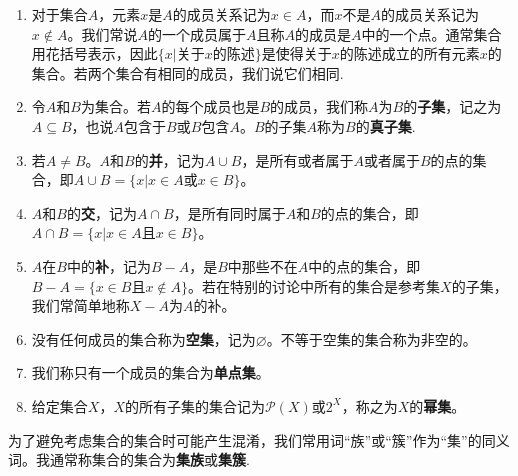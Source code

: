 \documentclass[lang=cn,newtx,10pt,scheme=chinese]{../Template/elegantbook}
\begin{document}
\begin{definition}[集合的基本概念]\label{definition:集合的基本概念}
\begin{enumerate}
  \item 对于集合\(A\)，元素\(x\)是\(A\)的成员关系记为\(x\in A\)，而\(x\)不是\(A\)的成员关系记为\(x\notin A\)。我们常说\(A\)的一个成员属于\(A\)且称\(A\)的成员是\(A\)中的一个点。通常集合用花括号表示，因此\(\{x|关于x的陈述\}\)是使得关于\(x\)的陈述成立的所有元素\(x\)的集合。若两个集合有相同的成员，我们说它们相同.

  \item 令\(A\)和\(B\)为集合。若\(A\)的每个成员也是\(B\)的成员，我们称\(A\)为\(B\)的\textbf{子集}，记之为\(A\subseteq B\)，也说\(A\)包含于\(B\)或\(B\)包含\(A\)。\(B\)的子集\(A\)称为\(B\)的\textbf{真子集}.

  \item 若\(A\neq B\)。\(A\)和\(B\)的\textbf{并}，记为\(A\cup B\)，是所有或者属于\(A\)或者属于\(B\)的点的集合，即\(A\cup B = \{x|x\in A或x\in B\}\)。

  \item \(A\)和\(B\)的\textbf{交}，记为\(A\cap B\)，是所有同时属于\(A\)和\(B\)的点的集合，即\(A\cap B = \{x|x\in A且x\in B\}\)。

  \item \(A\)在\(B\)中的\textbf{补}，记为\(B - A\)，是\(B\)中那些不在\(A\)中的点的集合，即\(B - A=\{x\in B且x\notin A\}\)。若在特别的讨论中所有的集合是参考集\(X\)的子集，我们常简单地称\(X - A\)为\(A\)的补。

  \item 没有任何成员的集合称为\textbf{空集}，记为\(\varnothing\)。不等于空集的集合称为非空的。

  \item 我们称只有一个成员的集合为\textbf{单点集}。

  \item 给定集合\(X\)，\(X\)的所有子集的集合记为\(\mathcal{P}(X)\)或\(2^X\)，称之为\(X\)的\textbf{幂集}。
\end{enumerate}
\end{definition}
\begin{remark}
  为了避免考虑集合的集合时可能产生混淆，我们常用词“族”或“簇”作为“集”的同义词。我通常称集合的集合为\textbf{集族}或\textbf{集簇}.
\end{remark}
\end{document}

